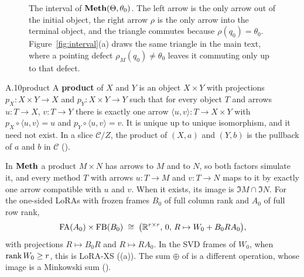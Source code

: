\begin{figure}[tbp]
\centering
{}
\caption{The interval of $\mathbf{Meth}(\Theta,\theta_0)$. The left arrow is the only arrow out of the initial object, the right
  arrow $\rho$ is the only arrow into the terminal object, and the triangle commutes because $\rho(q_0)=\theta_0$.
  Figure~\ref{fig:interval}(a) draws the same triangle in the main text, where a pointing defect
  $\rho_M(q_0)\neq\theta_0$ leaves it commuting only up to that defect.}
\label{fig:bg-interval}
\end{figure}


\begin{bgentry}{A.10}{product}
A \textbf{product} of $X$ and $Y$ is an object $X\times Y$ with projections $p_X:X\times Y\to X$ and
$p_Y:X\times Y\to Y$ such that for every object $T$ and arrows $u:T\to X$, $v:T\to Y$ there is exactly one arrow
$\langle u,v\rangle:T\to X\times Y$ with $p_X\circ\langle u,v\rangle=u$ and $p_Y\circ\langle u,v\rangle=v$. It is unique
up to unique isomorphism, and it need not exist. In a slice $\mathcal C/Z$, the product of $(X,a)$ and $(Y,b)$ is the
pullback of $a$ and $b$ in $\mathcal C$ ().
\end{bgentry}

In $\mathbf{Meth}$ a product $M\times N$ has arrows to $M$ and to $N$, so both factors simulate it, and every method $T$ with
arrows $u:T\to M$ and $v:T\to N$ maps to it by exactly one arrow compatible with $u$ and $v$. When it exists, its image is
$\Im M\cap\Im N$. For the one-sided LoRAs with frozen frames $B_0$ of full column rank and $A_0$ of full row rank,
\begin{equation*}
  \mathrm{FA}(A_0)\times\mathrm{FB}(B_0)\;\cong\;\big(\mathbb{R}^{r\times r},\,0,\,R\mapsto W_0+B_0RA_0\big),
\end{equation*}
with projections $R\mapsto B_0R$ and $R\mapsto RA_0$. In the SVD frames of $W_0$, when $\operatorname{rank} W_0\ge r$, this is LoRA-XS
\citep{baazy2024lora} ((a)). The sum $\oplus$ of  is a different
operation, whose image is a Minkowski sum ().

